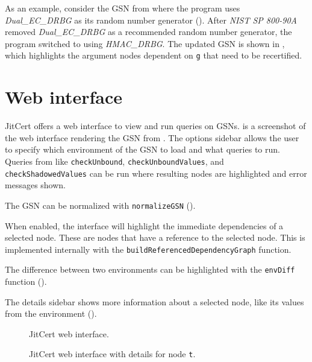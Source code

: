 \documentclass{article}
\newcommand{\jitcert}{JitCert\xspace}
\begin{document}
As an example, consider the GSN from  where the program uses \emph{Dual\_EC\_DRBG} as its random number generator (). 
After \emph{NIST SP 800-90A} removed \emph{Dual\_EC\_DRBG} as a recommended random number generator, 
the program switched to using \emph{HMAC\_DRBG}. 
The updated GSN is shown in , which highlights the argument nodes dependent on \texttt{g} that need to be recertified. 



\section{Web interface}

\jitcert offers a web interface to view and run queries on GSNs. 
 is a screenshot of the web interface rendering the GSN from . 
The options sidebar allows the user to specify which environment of the GSN to load and what queries to run. 
Queries from  like \texttt{checkUnbound}, \texttt{checkUnboundValues}, and \texttt{checkShadowedValues} can be run where 
resulting nodes are highlighted and error messages shown. 

The GSN can be normalized with 
\texttt{normalizeGSN} (). 

When enabled, the interface will highlight the immediate dependencies of a selected node. 
These are nodes that have a reference to the selected node. 
This is implemented internally with the \texttt{buildReferencedDependencyGraph} function. 

The difference between two environments can be highlighted with the \texttt{envDiff} function (). 

The details sidebar shows more information about a selected node, like its values from the environment (). 


\begin{figure}
\centering
{}
\caption{\jitcert web interface.}
\label{fig:web1}
\end{figure}

\begin{figure}
\centering
{}
\caption{\jitcert web interface with details for node \texttt{t}.}
\label{fig:web2}
\end{figure}






\end{document}
